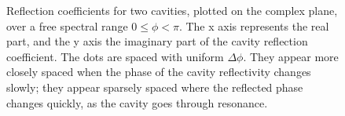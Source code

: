 \begin{figure}
\hfill {}\caption[Cavity amplitude reflectivity plotted in the complex plane]{Reflection coefficients for two cavities, plotted on the complex plane,
over a free spectral range $0\leq\phi<\pi$. The x axis represents
the real part, and the y axis the imaginary part of the cavity reflection
coefficient. The dots are spaced with uniform $\Delta\phi$. They
appear more closely spaced when the phase of the cavity reflectivity
changes slowly; they appear sparsely spaced where the reflected phase
changes quickly, as the cavity goes through resonance.}
\end{figure}

